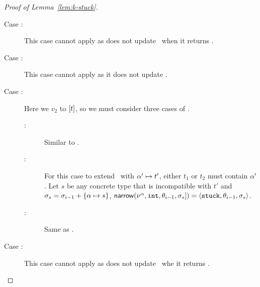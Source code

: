\begin{proof}[Proof of Lemma~\ref{lem:k-stuck}]
\begin{description}
    \item[Case \reappbad:]
      This case cannot apply as \forcesym does not update \tsu\ when
      it returns \stuck.
    \item[Case \renilgood:]
      This case cannot apply as it does not update \tsu.
    \item[Case \reconsgood:]
      Here we \forcesym $v_2$ to $[t]$,
      so we must consider three cases of \forcesym.
      \begin{description}
      \item[:]
        Similar to \replusgood.
      \item[:]
        For this case to extend \tsu\ with $\alpha' \mapsto t'$,
        either $t_1$ or $t_2$ must contain $\alpha'$.
        Let $s$ be any concrete type that is incompatible with $t'$
        and $\sigma_s = \sigma_{i-1} + \{\alpha \mapsto s\}$,
        $\mathsf{narrow}(\nu^{\alpha}, \mathtt{int}, \theta_{i-1}, \sigma_s]) = \langle \mathtt{stuck}, \theta_{i-1}, \sigma_s \rangle$.
      \item[:]
        Same as .
      \end{description}
    \item[Case \reconsbad:]
      This case cannot apply as \forcesym does not update \tsu\ whe
      it returns \stuck.

\end{description}
\end{proof}
